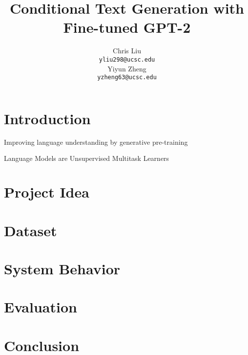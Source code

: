 \documentclass[11pt]{article}
\title{Conditional Text Generation with Fine-tuned GPT-2}
\author{
 Chris Liu \\
    \texttt{yliu298@ucsc.edu} \\
 \And
 Yiyun Zheng \\
    \texttt{yzheng63@ucsc.edu}
}
\begin{document}
\maketitle

\section{Introduction}

Improving language understanding by generative pre-training \cite{radford2018improving}

Language Models are Unsupervised Multitask Learners \cite{radford2019language}

\section{Project Idea}

\section{Dataset}

\section{System Behavior}

\section{Evaluation}

\section{Conclusion}

\clearpage

\printbibliography 
\end{document}
